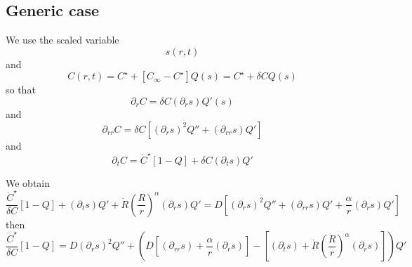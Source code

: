 \documentclass[11pt]{revtex4}
\begin{document}
\subsection{Generic case}
We use the scaled variable
\begin{equation}
	s(r,t)
\end{equation}
and
\begin{equation}
	C(r,t) = C^\star + \left[C_\infty-C^\star\right] Q(s) = C^\star + \delta C Q(s)
\end{equation}
so that
\begin{equation}
	\partial_r C = \delta C \left(\partial_r s\right) Q'(s)
\end{equation}
and
\begin{equation}
	\partial_{rr} C = \delta C \left[ \left(\partial_r s\right)^2 Q'' + \left(\partial_{rr}s\right) Q'\right]
\end{equation}
and
\begin{equation}
	\partial_{t} C = \dot{C}^\star \left[1-Q\right] + \delta C \left(\partial_t s\right) Q'
\end{equation}

We obtain
\begin{equation}
	\dfrac{\dot{C}^\star}{\delta C} \left[1-Q\right] +  \left(\partial_t s\right) Q' 
	+\dot{R} \left(\dfrac{R}{r}\right)^\alpha \left(\partial_r s\right) Q' = D  \left[ \left(\partial_r s\right)^2 Q'' + \left(\partial_{rr}s\right) Q' + \dfrac{\alpha}{r} \left(\partial_r s\right) Q'\right]
\end{equation}
then
\begin{equation}
	\dfrac{\dot{C}^\star}{\delta C} \left[1-Q\right] = 
	 D \left(\partial_r s\right)^2 Q''
	+\left( D\left[\left(\partial_{rr}s\right) + \dfrac{\alpha}{r} \left(\partial_r s\right) \right] - \left[ \left(\partial_t s\right) + \dot{R} \left(\dfrac{R}{r}\right)^\alpha \left(\partial_r s\right)\right]\right)Q'
\end{equation}
\end{document}
